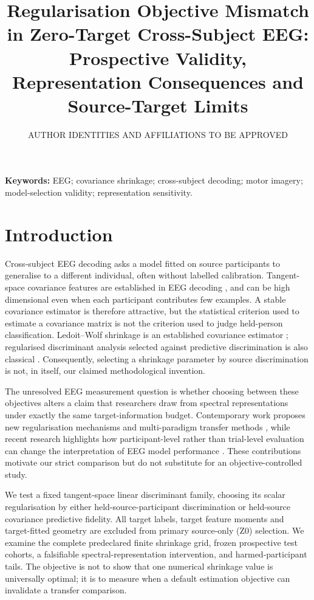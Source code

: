\documentclass[11pt,a4paper]{article}
\title{Regularisation Objective Mismatch in Zero-Target Cross-Subject EEG:\\
Prospective Validity, Representation Consequences and Source-Target Limits}
\author{AUTHOR IDENTITIES AND AFFILIATIONS TO BE APPROVED}
\date{}
\begin{document}
\maketitle

\noindent\textbf{Keywords:} EEG; covariance shrinkage; cross-subject decoding;
motor imagery; model-selection validity; representation sensitivity.

\section{Introduction}
Cross-subject EEG decoding asks a model fitted on source participants to
generalise to a different individual, often without labelled calibration.
Tangent-space covariance features are established in EEG decoding
\cite{barachant2012riemannian}, and can be high dimensional even
when each participant contributes few examples. A stable covariance estimator is therefore
attractive, but the statistical criterion used to estimate a covariance
matrix is not the criterion used to judge held-person classification.
Ledoit--Wolf shrinkage is an established covariance estimator
\cite{ledoit2004}; regularised discriminant analysis selected against
predictive discrimination is also classical \cite{friedman1989}.
Consequently, selecting a shrinkage parameter by source discrimination
is not, in itself, our claimed methodological invention.

The unresolved EEG measurement question is whether choosing between these
objectives alters a claim that researchers draw from spectral representations
under exactly the same target-information budget. Contemporary work proposes
new regularisation mechanisms and multi-paradigm transfer methods
\cite{miao2025freezing,morvay2026wbt,he2026cyclic}, while recent research highlights
how participant-level rather than trial-level evaluation can change the
interpretation of EEG model performance \cite{gil2026subjectvalidation}.
These contributions motivate our strict comparison but do not substitute
for an objective-controlled study.

We test a fixed tangent-space linear discriminant family, choosing its
scalar regularisation by either held-source-participant discrimination or
held-source covariance predictive fidelity. All target labels, target feature
moments and target-fitted geometry are excluded from primary source-only
(Z0) selection. We examine the complete predeclared finite shrinkage grid,
frozen prospective test cohorts, a falsifiable spectral-representation
intervention, and harmed-participant tails. The objective is not to show
that one numerical shrinkage value is universally optimal; it is to measure
when a default estimation objective can invalidate a transfer comparison.
\end{document}
